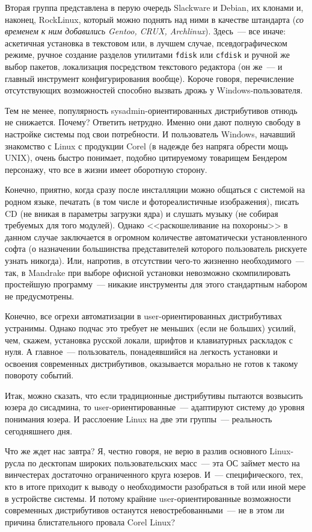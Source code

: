 Вторая группа представлена в перую очередь Slackware и Debian, их клонами и, наконец, RockLinux, который можно поднять над ними в качестве штандарта (\textsl{со временем к ним добавились Gentoo, CRUX, Archlinux}). Здесь~--- все иначе: аскетичная установка в текстовом или, в лучшем случае, псевдографическом режиме, ручное создание разделов утилитами \texttt{fdisk} или \texttt{cfdisk} и ручной же выбор пакетов, локализация посредством текстового редактора (он же~--- и главный инструмент конфигурирования вообще). Короче говоря, перечисление отсутствующих возможностей способно вызвать дрожь у Windows-пользователя.

Тем не менее, популярность sysadmin-ориентированных дистрибутивов отнюдь не снижается. Почему? Ответить нетрудно. Именно они дают полную свободу в настройке системы под свои потребности. И пользователь Windows, начавший знакомство с Linux с продукции Corel (в надежде без напряга обрести мощь UNIX), очень быстро понимает, подобно цитируемому товарищем Бендером персонажу, что все в жизни имеет оборотную сторону.

Конечно, приятно, когда сразу после инсталляции можно общаться с системой на родном языке, печатать (в том числе и фотореалистичные изображения), писать CD (не вникая в параметры загрузки ядра) и слушать музыку (не собирая требуемых для того модулей). Однако <<раскошеливание на похороны>> в данном случае заключается в огромном количестве автоматически установленного софта (о назначении большинства представителей которого пользователь рискуете узнать никогда). Или, напротив, в отсутствии чего-то жизненно необходимого~--- так, в Mandrake при выборе офисной установки невозможно скомпилировать простейшую программу~--- никакие инструменты для этого стандартным набором не предусмотрены.

Конечно, все огрехи автоматизации в user-ориентированных дистрибутивах устранимы. Однако подчас это требует не меньших (если не больших) усилий, чем, скажем, установка русской локали, шрифтов и клавиатурных раскладок с нуля. А главное~--- пользователь, понадеявшийся на легкость установки и освоения современных дистрибутивов, оказывается морально не готов к такому повороту событий.

Итак, можно сказать, что если традиционные дистрибутивы пытаются возвысить юзера до сисадмина, то user-ориентированные~--- адаптируют систему до уровня понимания юзера. И расслоение Linux на две эти группы~--- реальность сегодняшнего дня.

Что же ждет нас завтра? Я, честно говоря, не верю в разлив основного Linux-русла по десктопам широких пользовательских масс~--- эта ОС займет место на винчестерах достаточно ограниченного круга юзеров. И~--- специфического, тех, кто в итоге приходит к выводу о необходимости разобраться в той или иной мере в устройстве системы. И потому крайние user-ориентированные возможности современных дистрибутивов останутся невостребованными~--- не в этом ли причина блистательного провала Corel Linux?

